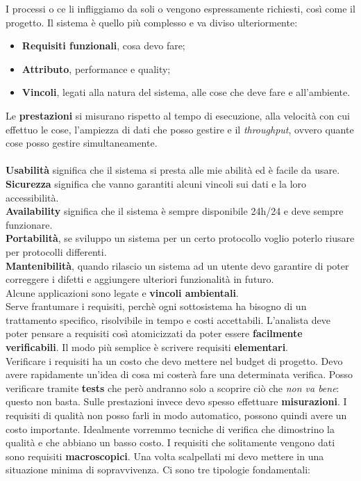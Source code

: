 \documentclass{article}
\begin{document}
I processi o ce li infliggiamo da soli o vengono espressamente richiesti, così come il progetto. Il sistema è quello più complesso e va diviso ulteriormente:

\begin{itemize}

	\item \textbf{Requisiti funzionali}, cosa devo fare;
	\item \textbf{Attributo}, performance e quality;
	\item \textbf{Vincoli}, legati alla natura del sistema, alle cose che deve fare e all'ambiente. 

\end{itemize}

Le \textbf{prestazioni} si misurano rispetto al tempo di esecuzione, alla velocità con cui effettuo le cose, l'ampiezza di dati che posso gestire e il \textit{throughput}, ovvero quante cose posso gestire simultaneamente.\\ \\
\textbf{Usabilità} significa che il sistema si presta alle mie abilità ed è facile da usare.\\
\textbf{Sicurezza} significa che vanno garantiti alcuni vincoli sui dati e la loro accessibilità.\\
\textbf{Availability} significa che il sistema è sempre disponibile 24h/24 e deve sempre funzionare.\\
\textbf{Portabilità}, se sviluppo un sistema per un certo protocollo voglio poterlo riusare per protocolli differenti.\\
\textbf{Mantenibilità}, quando rilascio un sistema ad un utente devo garantire di poter correggere i difetti e aggiungere ulteriori funzionalità in futuro.\\
Alcune applicazioni sono legate e \textbf{vincoli ambientali}.\\
Serve frantumare i requisiti, perchè ogni sottosistema ha bisogno di un trattamento specifico, risolvibile in tempo e costi accettabili. L'analista deve poter pensare a requisiti così atomicizzati da poter essere \textbf{facilmente verificabili}. Il modo più semplice è scrivere requisiti \textbf{elementari}.\\
Verificare i requisiti ha un costo che devo mettere nel budget di progetto. Devo avere rapidamente un'idea di cosa mi costerà fare una determinata verifica. Posso verificare tramite \textbf{tests} che però andranno solo a scoprire ciò che \textit{non va bene}: questo non basta. Sulle prestazioni invece devo spesso effettuare \textbf{misurazioni}. I requisiti di qualità non posso farli in modo automatico, possono quindi avere un costo importante. Idealmente vorremmo tecniche di verifica che dimostrino la qualità e che abbiano un basso costo. I requisiti che solitamente vengono dati sono requisiti \textbf{macroscopici}. Una volta scalpellati mi devo mettere in una situazione minima di sopravvivenza. Ci sono tre tipologie fondamentali:
\end{document}
